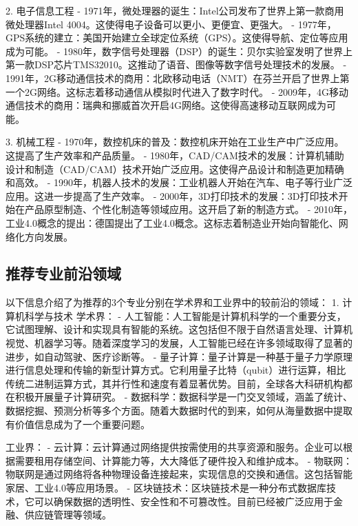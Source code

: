 \documentclass[12pt]{article}
\begin{document}
\begin{CJK*}{UTF8}{gbsn}
2. 电子信息工程
   - 1971年，微处理器的诞生：Intel公司发布了世界上第一款商用微处理器Intel 4004。这使得电子设备可以更小、更便宜、更强大。
   - 1977年，GPS系统的建立：美国开始建立全球定位系统（GPS）。这使得导航、定位等应用成为可能。
   - 1980年，数字信号处理器（DSP）的诞生：贝尔实验室发明了世界上第一款DSP芯片TMS32010。这推动了语音、图像等数字信号处理技术的发展。
   - 1991年，2G移动通信技术的商用：北欧移动电话（NMT）在芬兰开启了世界上第一个2G网络。这标志着移动通信从模拟时代进入了数字时代。
   - 2009年，4G移动通信技术的商用：瑞典和挪威首次开启4G网络。这使得高速移动互联网成为可能。

3. 机械工程
   - 1970年，数控机床的普及：数控机床开始在工业生产中广泛应用。这提高了生产效率和产品质量。
   - 1980年，CAD/CAM技术的发展：计算机辅助设计和制造（CAD/CAM）技术开始广泛应用。这使得产品设计和制造更加精确和高效。
   - 1990年，机器人技术的发展：工业机器人开始在汽车、电子等行业广泛应用。这进一步提高了生产效率。
   - 2000年，3D打印技术的发展：3D打印技术开始在产品原型制造、个性化制造等领域应用。这开启了新的制造方式。
   - 2010年，工业4.0概念的提出：德国提出了工业4.0概念。这标志着制造业开始向智能化、网络化方向发展。

   \newpage
   \subsection*{推荐专业前沿领域}
   以下信息介绍了为推荐的3个专业分别在学术界和工业界中的较前沿的领域：
   1. 计算机科学与技术
   学术界：
   - 人工智能：人工智能是计算机科学的一个重要分支，它试图理解、设计和实现具有智能的系统。这包括但不限于自然语言处理、计算机视觉、机器学习等。随着深度学习的发展，人工智能已经在许多领域取得了显著的进步，如自动驾驶、医疗诊断等。
   - 量子计算：量子计算是一种基于量子力学原理进行信息处理和传输的新型计算方式。它利用量子比特（qubit）进行运算，相比传统二进制运算方式，其并行性和速度有着显著优势。目前，全球各大科研机构都在积极开展量子计算研究。
   - 数据科学：数据科学是一门交叉领域，涵盖了统计、数据挖掘、预测分析等多个方面。随着大数据时代的到来，如何从海量数据中提取有价值信息成为了一个重要问题。

   工业界：
   - 云计算：云计算通过网络提供按需使用的共享资源和服务。企业可以根据需要租用存储空间、计算能力等，大大降低了硬件投入和维护成本。
   - 物联网：物联网是通过网络将各种物理设备连接起来，实现信息的交换和通信。这包括智能家居、工业4.0等应用场景。
   - 区块链技术：区块链技术是一种分布式数据库技术，它可以确保数据的透明性、安全性和不可篡改性。目前已经被广泛应用于金融、供应链管理等领域。


\end{CJK*}
\end{document}
